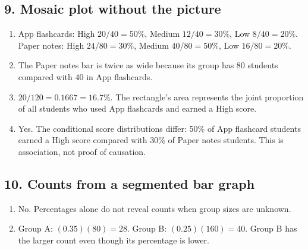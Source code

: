 \documentclass[11pt]{article}
\newcommand{\ans}[1]{\textcolor{AnswerBlue}{#1}}
\begin{document}
\subsection*{9. Mosaic plot without the picture}
\begin{answerbox}
\begin{enumerate}[label=\alph*.]
  \item \ans{App flashcards: High $20/40=50\%$, Medium $12/40=30\%$, Low $8/40=20\%$. Paper notes: High $24/80=30\%$, Medium $40/80=50\%$, Low $16/80=20\%$.}
  \item \ans{The Paper notes bar is twice as wide because its group has 80 students compared with 40 in App flashcards.}
  \item \ans{$20/120=0.1667=16.7\%$. The rectangle's area represents the joint proportion of all students who used App flashcards and earned a High score.}
  \item \ans{Yes. The conditional score distributions differ: 50\% of App flashcard students earned a High score compared with 30\% of Paper notes students. This is association, not proof of causation.}
\end{enumerate}
\end{answerbox}

\subsection*{10. Counts from a segmented bar graph}
\begin{answerbox}
\begin{enumerate}[label=\alph*.]
  \item \ans{No. Percentages alone do not reveal counts when group sizes are unknown.}
  \item \ans{Group A: $(0.35)(80)=28$. Group B: $(0.25)(160)=40$. Group B has the larger count even though its percentage is lower.}
\end{enumerate}
\end{answerbox}
\end{document}
